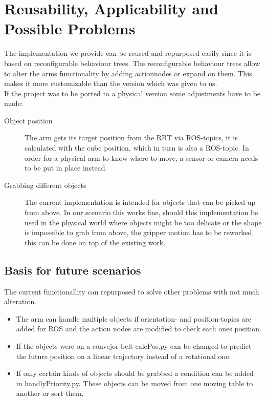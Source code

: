 \documentclass[report]{iisthesis}
\begin{document}
\chapter{Reusability, Applicability and Possible Problems}
The implementation we provide can be reused and repurposed easily since it is based on reconfigurable behaviour trees. The reconfigurable behaviour trees allow to alter the arms functionality
by adding actionnodes or expand on them. This makes it more customizable than the version which was given to us. \\
If the project was to be ported to a physical version some adjustments have to be made:
\begin{description}
    \item[Object position] The arm gets its target position from the RBT via ROS-topics, it is calculated with the cube position, which in turn is also a ROS-topic. In order for a physical arm to know where to move, a sensor or camera needs to be put in place instead. 
    \item[Grabbing different objects] The current implementation is intended for objects that can be picked up from above. In our scenario this works fine, should this implementation be used in the physical world where objects might be too delicate or the shape is impossible
    to grab from above, the gripper motion has to be reworked, this can be done on top of the existing work.
\end{description} 
\noindent
\section{Basis for future scenarios}
The current functionallity can repurposed to solve other problems with not much alteration.
\begin{itemize}
    \item The arm can handle multiple objects if orientation- and position-topics are added for ROS and the action nodes are modified to check each ones position. 
    \item If the objects were on a convejor belt calcPos.py can be changed to predict the future position on a linear trajectory instead of a rotational one.
    \item If only certain kinds of objects should be grabbed a condition can be added in handlyPriority.py. These objects can be moved from one moving table to another or sort them.
\end{itemize}



\end{document}
